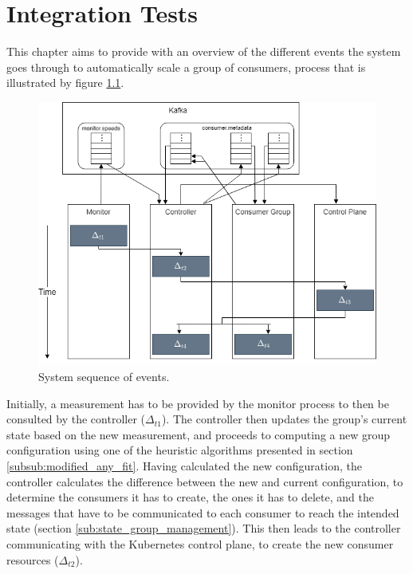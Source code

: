 \chapter{Integration Tests} 
\label{chap:integration_tests}

This chapter aims to provide with an overview of the different events the system
goes through to automatically scale a group of consumers, process that is
illustrated by figure \ref{fig:step_event_sequence}. 

\begin{figure}[H]
\centering
\includegraphics[width=\textwidth]{images/integration/Integration_diagram.png}
\caption{System sequence of events.}
\label{fig:step_event_sequence}
\end{figure}

Initially, a measurement has to be provided by the monitor process to then be
consulted by the controller ($\Delta_{t1}$). The controller then updates the
group's current state based on the new measurement, and proceeds to computing a
new group configuration using one of the heuristic algorithms presented in
section \ref{subsub:modified_any_fit}.  Having calculated the new configuration, the controller
calculates the difference between the new and current configuration, to
determine the consumers it has to create, the ones it has to delete, and the
messages that have to be communicated to each consumer to reach the intended
state (section \ref{sub:state_group_management}). This then leads to the controller communicating with the
Kubernetes control plane, to create the new consumer resources ($\Delta_{t2}$). 

